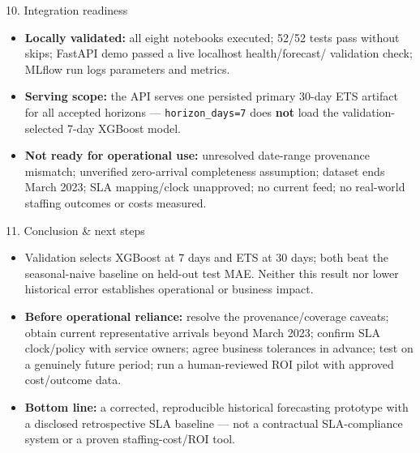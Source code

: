 \documentclass[
  ignorenonframetext,
]{beamer}
\providecommand{\tightlist}{%
  \setlength{\itemsep}{0pt}\setlength{\parskip}{0pt}}
\begin{document}
\begin{frame}[fragile]
\begin{block}{10. Integration readiness}
\protect{}\label{10-integration-readiness}
\begin{itemize}
\tightlist
\item
  \textbf{Locally validated:} all eight notebooks executed; 52/52 tests
  pass without skips; FastAPI demo passed a live localhost
  health/forecast/ validation check; MLflow run logs parameters and
  metrics.
\item
  \textbf{Serving scope:} the API serves one persisted primary 30-day
  ETS artifact for all accepted horizons --- \texttt{horizon\_days=7}
  does \textbf{not} load the validation-selected 7-day XGBoost model.
\item
  \textbf{Not ready for operational use:} unresolved date-range
  provenance mismatch; unverified zero-arrival completeness assumption;
  dataset ends March 2023; SLA mapping/clock unapproved; no current
  feed; no real-world staffing outcomes or costs measured.
\end{itemize}
\end{block}
\end{frame}

\begin{frame}
\begin{block}{11. Conclusion \& next steps}
\protect{}\label{11-conclusion--next-steps}
\begin{itemize}
\tightlist
\item
  Validation selects XGBoost at 7 days and ETS at 30 days; both beat the
  seasonal-naive baseline on held-out test MAE. Neither this result nor
  lower historical error establishes operational or business impact.
\item
  \textbf{Before operational reliance:} resolve the provenance/coverage
  caveats; obtain current representative arrivals beyond March 2023;
  confirm SLA clock/policy with service owners; agree business
  tolerances in advance; test on a genuinely future period; run a
  human-reviewed ROI pilot with approved cost/outcome data.
\item
  \textbf{Bottom line:} a corrected, reproducible historical forecasting
  prototype with a disclosed retrospective SLA baseline --- not a
  contractual SLA-compliance system or a proven staffing-cost/ROI tool.
\end{itemize}
\end{block}
\end{frame}
\end{document}
